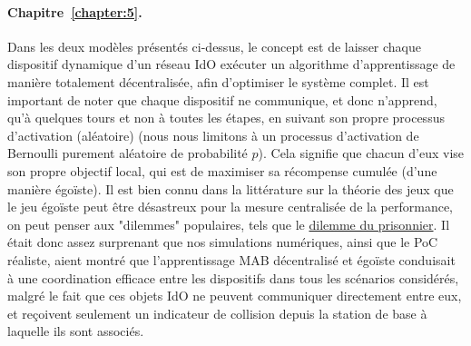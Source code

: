 \begin{resume_fr}
\paragraph{Chapitre~\ref{chapter:5}.}
%
Dans les deux modèles présentés ci-dessus, le concept est de laisser chaque dispositif dynamique d'un réseau IdO exécuter un algorithme d'apprentissage de manière totalement décentralisée, afin d'optimiser le système complet.
Il est important de noter que chaque dispositif ne communique, et donc n'apprend, qu'à quelques tours et non à toutes les étapes, en suivant son propre processus d'activation (aléatoire) (nous nous limitons à un processus d'activation de Bernoulli purement aléatoire de probabilité $p$).
Cela signifie que chacun d'eux vise son propre objectif local, qui est de maximiser sa récompense cumulée (d'une manière égoïste).
Il est bien connu dans la littérature sur la théorie des jeux que le jeu égoïste peut être désastreux pour la mesure centralisée de la performance, on peut penser aux "dilemmes" populaires, tels que le \href{https://fr.wikipedia.org/wiki/Dilemme_du_prisonnier}{dilemme du prisonnier}.
Il était donc assez surprenant que nos simulations numériques, ainsi que le PoC réaliste, aient montré que l'apprentissage MAB décentralisé et égoïste conduisait à une coordination efficace entre les dispositifs dans tous les scénarios considérés, malgré le fait que ces objets IdO ne peuvent communiquer directement entre eux, et reçoivent seulement un indicateur de collision depuis la station de base à laquelle ils sont associés.


\end{resume_fr}

